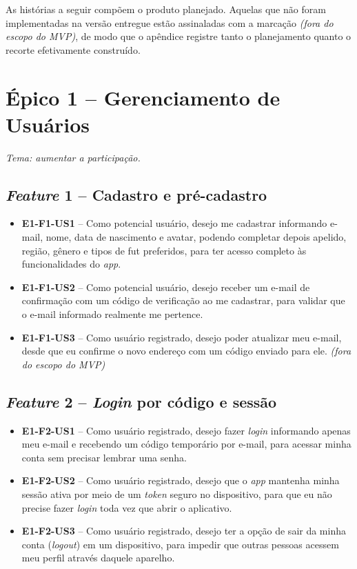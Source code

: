 \begin{apendicesenv}
    As histórias a seguir compõem o produto planejado. Aquelas que não foram implementadas
    na versão entregue estão assinaladas com a marcação \textit{(fora do escopo do MVP)},
    de modo que o apêndice registre tanto o planejamento quanto o recorte efetivamente construído.

    \section*{Épico 1 -- Gerenciamento de Usuários}
    \textit{Tema: aumentar a participação.}

    \subsection*{\textit{Feature} 1 -- Cadastro e pré-cadastro}
    \begin{itemize}
        \item \textbf{E1-F1-US1} -- Como potencial usuário, desejo me cadastrar informando e-mail, nome, data de nascimento e avatar, podendo completar depois apelido, região, gênero e tipos de fut preferidos, para ter acesso completo às funcionalidades do \textit{app}.
        \item \textbf{E1-F1-US2} -- Como potencial usuário, desejo receber um e-mail de confirmação com um código de verificação ao me cadastrar, para validar que o e-mail informado realmente me pertence.
        \item \textbf{E1-F1-US3} -- Como usuário registrado, desejo poder atualizar meu e-mail, desde que eu confirme o novo endereço com um código enviado para ele. \textit{(fora do escopo do MVP)}
    \end{itemize}

    \subsection*{\textit{Feature} 2 -- \textit{Login} por código e sessão}
    \begin{itemize}
        \item \textbf{E1-F2-US1} -- Como usuário registrado, desejo fazer \textit{login} informando apenas meu e-mail e recebendo um código temporário por e-mail, para acessar minha conta sem precisar lembrar uma senha.
        \item \textbf{E1-F2-US2} -- Como usuário registrado, desejo que o \textit{app} mantenha minha sessão ativa por meio de um \textit{token} seguro no dispositivo, para que eu não precise fazer \textit{login} toda vez que abrir o aplicativo.
        \item \textbf{E1-F2-US3} -- Como usuário registrado, desejo ter a opção de sair da minha conta (\textit{logout}) em um dispositivo, para impedir que outras pessoas acessem meu perfil através daquele aparelho.
    \end{itemize}


\end{apendicesenv}
